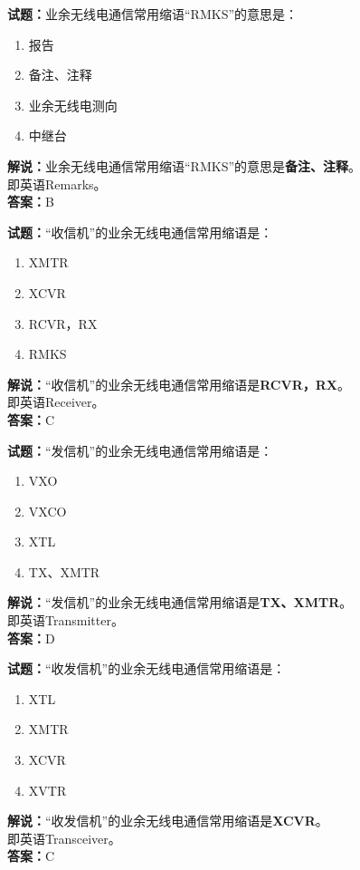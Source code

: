 \documentclass{ctexbook}
\begin{document}
\bigskip


\noindent\textbf{试题：}业余无线电通信常用缩语“RMKS”的意思是：
\begin{enumerate}[leftmargin=3em]
\item 报告
\item 备注、注释
\item 业余无线电测向
\item 中继台
\end{enumerate}
\noindent\textbf{解说：}业余无线电通信常用缩语“RMKS”的意思是\textbf{备注、注释}。\\即英语Remarks。\\\noindent\textbf{答案：}B



\bigskip


\noindent\textbf{试题：}“收信机”的业余无线电通信常用缩语是：
\begin{enumerate}[leftmargin=3em]
\item XMTR
\item XCVR
\item RCVR，RX
\item RMKS
\end{enumerate}
\noindent\textbf{解说：}“收信机”的业余无线电通信常用缩语是\textbf{RCVR，RX}。\\即英语Receiver。\\\noindent\textbf{答案：}C



\bigskip


\noindent\textbf{试题：}“发信机”的业余无线电通信常用缩语是：
\begin{enumerate}[leftmargin=3em]
\item VXO
\item VXCO
\item XTL
\item TX、XMTR
\end{enumerate}
\noindent\textbf{解说：}“发信机”的业余无线电通信常用缩语是\textbf{TX、XMTR}。\\即英语Transmitter。\\\noindent\textbf{答案：}D



\bigskip


\noindent\textbf{试题：}“收发信机”的业余无线电通信常用缩语是：
\begin{enumerate}[leftmargin=3em]
\item XTL
\item XMTR
\item XCVR
\item XVTR
\end{enumerate}
\noindent\textbf{解说：}“收发信机”的业余无线电通信常用缩语是\textbf{XCVR}。\\即英语Transceiver。\\\noindent\textbf{答案：}C
\end{document}
